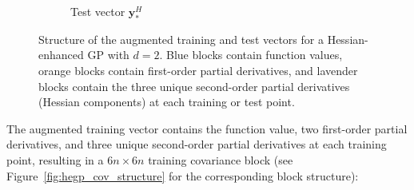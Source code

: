 \documentclass[12pt]{article}
\begin{document}
\begin{figure}[H]
\begin{subfigure}[t]{0.45\textwidth}
		\caption{Test vector $\mathbf{y}^{H}_*$}
		\label{fig:hegp_test_vec_2d}
	\end{subfigure}
	
	\caption{Structure of the augmented training and test vectors for a Hessian-enhanced GP with $d=2$. Blue blocks contain function values, orange blocks contain first-order partial derivatives, and lavender blocks contain the three unique second-order partial derivatives (Hessian components) at each training or test point.}
	\label{fig:hegp_aug_vectors_2d}
\end{figure}
The augmented training vector contains the function value, two first-order partial derivatives, and three unique second-order partial derivatives at each training point, resulting in a $6n \times 6n$ training covariance block (see Figure~\ref{fig:hegp_cov_structure} for the corresponding block structure):
\end{document}

